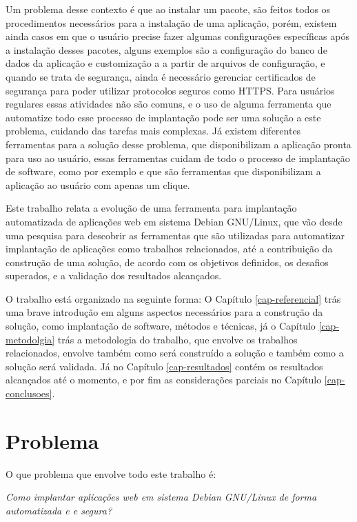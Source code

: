 Um problema desse contexto é que ao instalar um pacote, são feitos todos os
procedimentos necessários para a instalação de uma aplicação, porém, existem
ainda casos em que o usuário precise fazer algumas configurações específicas após
a instalação desses pacotes, alguns exemplos são a configuração do banco de dados
da aplicação e customização a a partir de arquivos de configuração, e quando se
trata de segurança, ainda é necessário gerenciar certificados de segurança para
poder utilizar protocolos seguros como HTTPS. Para usuários regulares essas
atividades não são comuns, e o uso de alguma ferramenta que automatize todo
esse processo de implantação pode ser uma solução a este problema, cuidando das
tarefas mais complexas. Já existem diferentes ferramentas para a solução desse
problema, que disponibilizam a aplicação pronta para uso ao usuário, essas ferramentas
cuidam de todo o processo de implantação de software, como por exemplo \cite{bitnami}
e \cite{sandstormio} que são ferramentas que disponibilizam a aplicação ao
usuário com apenas um clique.

Este trabalho relata a evolução de uma ferramenta para implantação automatizada
de aplicações web em sistema Debian GNU/Linux, que vão desde uma pesquisa para
descobrir as ferramentas que são utilizadas para automatizar implantação de aplicações
como trabalhos relacionados, até a contribuição da construção de uma solução, de
acordo com os objetivos definidos, os desafios superados, e a validação dos
resultados alcançados.

O trabalho está organizado na seguinte forma:  O Capítulo \ref{cap-referencial}
trás uma brave introdução em alguns aspectos necessários para a construção da solução,
como implantação de software, métodos e técnicas, já o Capítulo \ref{cap-metodolgia}
trás a metodologia do trabalho, que envolve os trabalhos relacionados, envolve também
como será construído a solução e também como a solução será validada. Já no Capítulo
\ref{cap-resultados} contém os resultados alcançados até o momento, e por fim as
considerações parciais no Capítulo \ref{cap-conclusoes}.

\section{Problema}

O que problema que envolve todo este trabalho é:

\begin{center}
  \textit{
  Como implantar aplicações web em sistema Debian GNU/Linux de forma automatizada e
  e segura?
}
\end{center}

